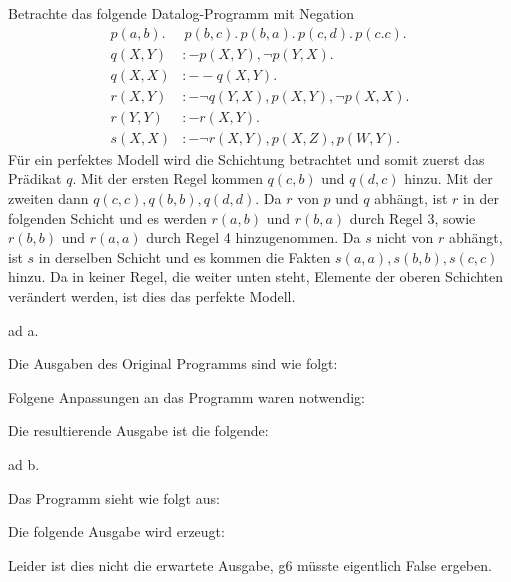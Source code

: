 \documentclass[12pt,a4paper]{amsart}
\begin{document}
\begin{aufgabe1}
Betrachte das folgende Datalog-Programm mit Negation
\begin{equation*}
\begin{split}
 p(a,b).&\,p(b,c).\,p(b,a).\,p(c,d).\,p(c.c).\\
 q(X,Y) &:- p(X,Y),\lnot p(Y,X).\\
 q(X,X) &:- -q(X,Y).\\
 r(X,Y)&:-\lnot q(Y,X),p(X,Y),\lnot p(X,X).\\
 r(Y,Y)&:-r(X,Y).\\
 s(X,X) &:- \lnot r(X,Y),p(X,Z),p(W,Y).
 \end{split}
\end{equation*}
Für ein perfektes Modell wird die Schichtung betrachtet und somit zuerst das Prädikat $q$. Mit der ersten Regel kommen $q(c,b)$ und $q(d,c)$ hinzu. Mit der zweiten dann
$q(c,c),q(b,b),q(d,d)$. Da $r$ von $p$ und $q$ abhängt, ist $r$ in der folgenden Schicht und es werden $r(a,b)$ und $r(b,a)$ durch Regel 3, sowie $r(b,b)$ und $r(a,a)$ durch
Regel 4 hinzugenommen. Da $s$ nicht von $r$ abhängt, ist $s$ in derselben Schicht und es kommen die Fakten $s(a,a), s(b,b),s(c,c)$ hinzu. Da in keiner Regel, die weiter unten
steht, Elemente der oberen Schichten verändert werden, ist dies das perfekte Modell.
\end{aufgabe1}

\begin{aufgabe1}
ad a.

Die Ausgaben des Original Programms sind wie folgt:


Folgene Anpassungen an das Programm waren notwendig:


Die resultierende Ausgabe ist die folgende:


\medskip

ad b.

Das Programm sieht wie folgt aus:


Die folgende Ausgabe wird erzeugt:


Leider ist dies nicht die erwartete Ausgabe, g6 müsste eigentlich False ergeben.

\end{aufgabe1}
\end{document}
